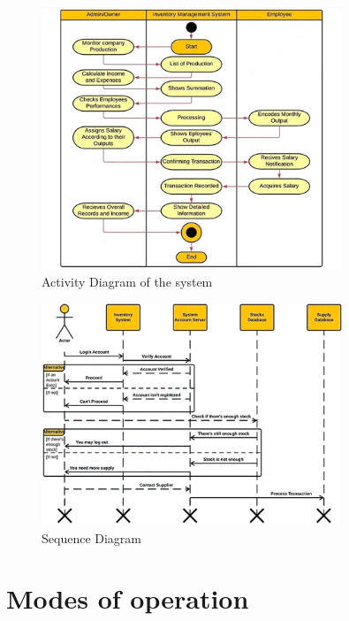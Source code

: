 \begin{figure}[H]
  \centering
   \includegraphics[width=9cm]{Figures/ActivityDiagram.jpeg}
  \caption{Activity Diagram of the system}
\label{}
\end{figure}

\begin{figure}[H]
  \centering
   \includegraphics[width=9cm]{Figures/SequenceDiagram.jpeg}
  \caption{Sequence Diagram}
\label{}
\end{figure}

\section{Modes of operation \label{Section::Modesofoperation}}


